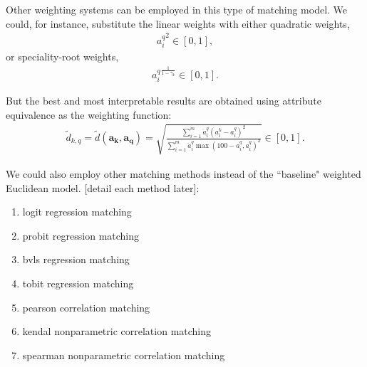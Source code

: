 \documentclass{elsarticle} %
\begin{document}
Other weighting systems can be employed in this type of matching model. We
could, for instance, substitute the linear weights with either quadratic
weights,
\begin{gather}
    {a_{i}^{q}} ^ 2
    \in [0,1]
    ,
\end{gather}
or speciality-root weights,
\begin{gather}
    {a_{i}^{q}} ^ {
        \frac{1}{1 - \gamma_k}
    }
    \in [0,1]
    .
\end{gather}

But the best and most interpretable results are obtained using attribute
equivalence as the weighting function:
\begin{gather}
    \tilde{d}_{k,q} =
    \tilde{d}(\boldsymbol{a_k}, \boldsymbol{a_q}) =
    \sqrt{
    \frac{
    \sum_{i = 1}^{m}{
    \ddot{a}_{i}^{q} (a_{i}^{k} - a_{i}^{q})^2
    }
    }{
    \sum_{i = 1}^{m}{
    \ddot{a}_{i}^{q} \max(100 - a_{i}^{q}, a_{i}^{q})^2
    }
    }
    }
    \in [0,1]
    .
\end{gather}

We could also employ other matching methods instead of the ``baseline" weighted
Euclidean model. [detail each method later]:
\begin{enumerate}
    \item logit regression matching
    \item probit regression matching
    \item bvls regression matching
    \item tobit regression matching
    \item pearson correlation matching
    \item kendal nonparametric correlation matching
    \item spearman nonparametric correlation matching
\end{enumerate}
\end{document}
